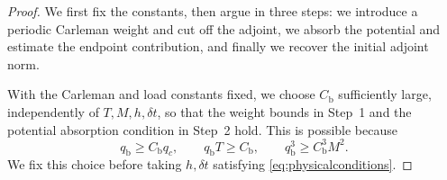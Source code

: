 \documentclass[print,wide,eng]{draft}
\begin{document}
%
\begin{proof}
We first fix the constants, then argue in three steps: we introduce a periodic Carleman weight and cut off the adjoint, we absorb the potential and estimate the endpoint contribution, and finally we recover the initial adjoint norm.


With the Carleman and load constants fixed, we choose $C_{\mathrm b}$ sufficiently large, independently of $T,M,h,\delta t$, so that the weight bounds in Step~1 and the potential absorption condition in Step~2 hold. This is possible because
%
$$
q_{\mathrm b}\ge C_{\mathrm b}q_c,\qquad
q_{\mathrm b}T\ge C_{\mathrm b},\qquad
q_{\mathrm b}^3\ge C_{\mathrm b}^3M^2.
$$
%
We fix this choice before taking $h,\delta t$ satisfying \cref{eq:physicalconditions}.

\medskip


\end{proof}
\end{document}
